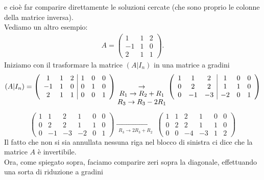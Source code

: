 e cioè far comparire direttamente le soluzioni cercate (che sono proprio le colonne della matrice inversa).\\
Vediamo un altro esempio:
\begin{eqnarray*}
  A=\begin{pmatrix}
      1 &1 &2\\
      -1 & 1 &0\\
      2 & 1 &1
  \end{pmatrix}.
\end{eqnarray*}
Iniziamo con il trasformare la matrice $(A|I_n)$ in una matrice a gradini
\begin{equation*}
  (A|I_n)=
  \left(
  \begin{array}[center]{ccc|ccc}
    1 & 1 & 2 &1 &0&0\\
    -1 & 1 &0 & 0&1&0\\
    2 &1 &1&0&0&1
  \end{array}\right)
  \underset{
  \begin{matrix}
    R_1\to R_2+R_1\\ R_3\to  R_3-2R_1
  \end{matrix}}{\to}
  \left(
  \begin{array}{ccc|ccc}
     1 & 1 & 2 &1 &0&0\\
    0 & 2 &2 & 1&1&0\\
     0 & -1 &-3&-2&0&1
  \end{array}\right)
\end{equation*}
\begin{equation*}
  \left(
  \begin{array}{ccc|ccc}
     1 & 1 & 2 &1 &0&0\\
    0 & 2 &2 & 1&1&0\\
     0 & -1 &-3&-2&0&1
  \end{array}\right)
  \underset{
  \begin{matrix}
    R_3\to 2R_3+R_2
  \end{matrix}}{\rightarrow} 
  \left(
  \begin{array}{ccc|ccc}
     1 & 1 & 2 &1 &0&0\\
    0 & 2 &2 & 1&1&0\\
     0 & 0 &-4&-3&1&2
  \end{array}\right)
\end{equation*}
Il fatto che non si sia annullata nessuna riga nel blocco di sinistra ci dice che la matrice $A$ è invertibile.\\
Ora, come spiegato sopra, faciamo comparire zeri sopra la diagonale, effettuando una sorta di riduzione a gradini
